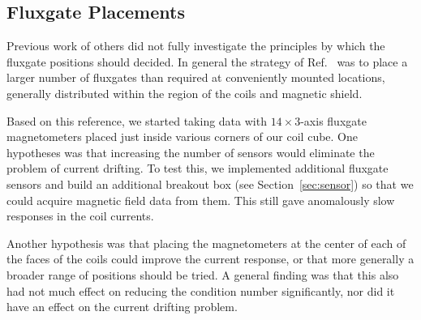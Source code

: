 \subsection{Fluxgate Placements}

Previous work of others did not fully investigate the principles by
which the fluxgate positions should decided.  In general the strategy
of Ref.~\cite{bea} was to place a larger number of
fluxgates than required at conveniently mounted locations, generally
distributed within the region of the coils and magnetic shield.

Based on this reference, we started taking data with $14\times 3$-axis fluxgate
magnetometers placed just inside various corners of our coil cube.
One hypotheses was that increasing the number of sensors would
eliminate the problem of current drifting. To test this, we
implemented additional fluxgate sensors and build an additional
breakout box (see Section~\ref{sec:sensor}) so that we could acquire
magnetic field data from them.  This still gave anomalously slow
responses in the coil currents.

Another hypothesis was that placing the magnetometers at the center of
each of the faces of the coils could improve the current response, or
that more generally a broader range of positions should be tried.  A
general finding was that this also had not much effect on reducing the
condition number significantly, nor did it have an effect on the
current drifting problem.


